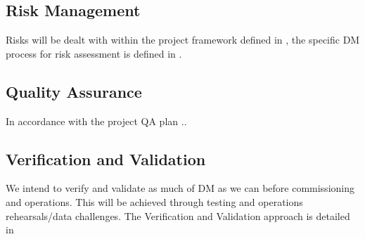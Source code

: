 \subsection {Risk Management } \label{sect:risk}

Risks will be dealt with within the project framework defined in , the specific DM process for risk assessment is defined in .


\subsection {Quality Assurance  } \label{sect:pa}
In accordance with the project QA plan  ..

\subsection {Verification and Validation } \label{sect:vanv}
We intend to verify and validate as much of DM as we can before commissioning and operations. This will be achieved through testing and
operations rehearsals/data challenges. The Verification and Validation approach is detailed in \citeyearpar{LDM-503}
